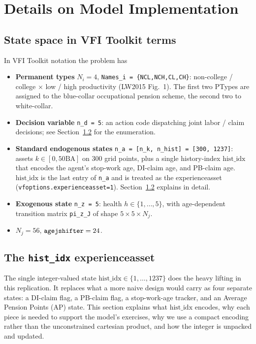 \section{Details on Model Implementation}\label{app:model-impl}

\subsection{State space in VFI Toolkit terms}
In VFI Toolkit notation the problem has

\begin{itemize}
\item \textbf{Permanent types} $N_i = 4$, \verb|Names_i = {NCL,NCH,CL,CH}|: non-college / college $\times$ low / high productivity (LW2015 Fig.~1). The first two PTypes are assigned to the blue-collar occupational pension scheme, the second two to white-collar.
\item \textbf{Decision variable} \verb|n_d = 5|: an action code dispatching joint labor / claim decisions; see Section~\ref{sec:histidx} for the enumeration.
\item \textbf{Standard endogenous states} \verb|n_a = [n_k, n_hist] = [300, 1237]|: assets $k\in[0,50\text{BA}]$ on 300 grid points, plus a single history-index $\text{hist\_idx}$ that encodes the agent's stop-work age, DI-claim age, and PB-claim age. $\text{hist\_idx}$ is the last entry of \verb|n_a| and is treated as the experienceasset (\verb|vfoptions.experienceasset=1|). Section~\ref{sec:histidx} explains in detail.
\item \textbf{Exogenous state} \verb|n_z = 5|: health $h\in\{1,\ldots,5\}$, with age-dependent transition matrix \verb|pi_z_J| of shape $5\times 5\times N_j$.
\item $N_j = 56$, $\verb|agejshifter| = 24$.
\end{itemize}


\subsection{The \texttt{hist\_idx} experienceasset}\label{sec:histidx}

The single integer-valued state $\text{hist\_idx}\in\{1,\ldots,1237\}$ does the heavy lifting in this replication. It replaces what a more naive design would carry as four separate states: a DI-claim flag, a PB-claim flag, a stop-work-age tracker, and an Average Pension Points (AP) state. This section explains what $\text{hist\_idx}$ encodes, why each piece is needed to support the model's exercises, why we use a compact encoding rather than the unconstrained cartesian product, and how the integer is unpacked and updated.

